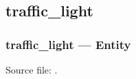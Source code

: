 \documentclass[letterpaper,10pt,english]{sphinxmanual}
\begin{document}
\sphinxstepscope


\subsection{traffic\_light}
\label{\detokenize{modules/traffic_light/index:traffic-light}}\label{\detokenize{modules/traffic_light/index::doc}}
\sphinxstepscope


\subsubsection{traffic\_light — Entity}
\label{\detokenize{modules/traffic_light/entity:traffic-light-entity}}\label{\detokenize{modules/traffic_light/entity::doc}}
\sphinxAtStartPar
Source file: .
\end{document}
